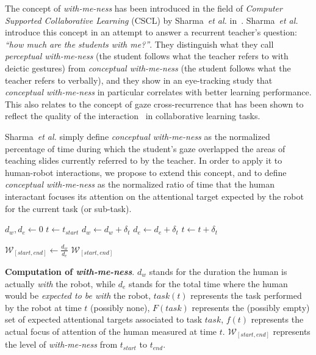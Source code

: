 \documentclass{sig-alternate}
\newcommand{\etal}{\textit{et al.}\xspace}
\begin{document}
The concept of \emph{with-me-ness} has been introduced in the field of
\emph{Computer Supported Collaborative Learning} (CSCL) by Sharma~\etal
in~\cite{sharma2014me}. Sharma~\etal introduce this concept in an attempt to
answer a recurrent teacher's question: {\it ``how much are the students with
me?''}. They distinguish what they call \emph{perceptual with-me-ness} (the
student follows what the teacher refers to with deictic gestures) from
\emph{conceptual with-me-ness} (the student follows what the teacher refers to
verbally), and they show in an eye-tracking study that \emph{conceptual
with-me-ness} in particular correlates with better learning performance. This
also relates to the concept of gaze cross-recurrence that has been shown to
reflect the quality of the interaction~\cite{jermann2012effects} in
collaborative learning tasks.

Sharma~\etal simply define \emph{conceptual with-me-ness} as the normalized
percentage of time during which the student's gaze overlapped the areas of
teaching slides currently referred to by the teacher.  In order to apply it to
human-robot interactions, we propose to extend this concept, and to define
\emph{conceptual with-me-ness} as the normalized ratio of time that the human
interactant focuses its attention on the attentional target expected by the
robot for the current task (or sub-task).


\begin{algorithm}[h!]
    \centering

    \begin{algorithmic}[1]
     {}
    \State $d_w, d_e \gets 0$
    \State $t \gets t_{start}$
    \Repeat
     \label{algline:skiplosttrack}
            \State $d_w \gets d_w + \delta_t$
        \EndIf
        \State $d_e \gets d_e + \delta_t$
    \EndIf
    \State $t \gets t + \delta_t$

    \State $\mathcal{W}_{[start, end]} \gets \frac{d_w}{d_e}$
    \State \Return $\mathcal{W}_{[start, end]}$
    \EndProcedure

    \end{algorithmic}

    \caption{\textbf{Computation of \emph{with-me-ness}}. $d_w$ stands for the duration
        the human is actually \emph{with} the robot, while $d_e$ stands for the
        total time where the human would be \emph{expected to be with} the robot, $task(t)$
        represents the task performed by the robot at time $t$ (possibly none),
        $F(task)$ represents the (possibly empty) set of expected attentional
        targets associated to task $task$, $f(t)$ represents the actual focus of
        attention of the human measured at time $t$. $\mathcal{W}_{[start, end]}$ represents
        the level of \emph{with-me-ness} from $t_{start}$ to $t_{end}$.}
    \label{alg:with-me-ness}
\end{algorithm}
\end{document}
